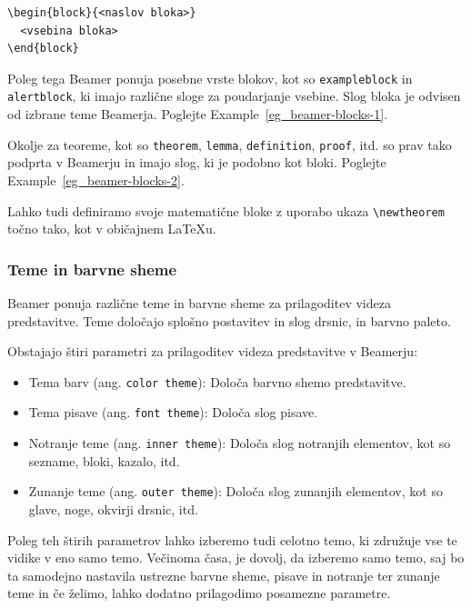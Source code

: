 \begin{verbatim}
\begin{block}{<naslov bloka>}
  <vsebina bloka>
\end{block}
\end{verbatim}

Poleg tega Beamer ponuja posebne vrste blokov, kot so \texttt{exampleblock} in \texttt{alertblock}, ki imajo različne sloge za poudarjanje vsebine. Slog bloka je odvisen od izbrane teme Beamerja. Poglejte Example~\ref{eg_beamer-blocks-1}.

\begin{example}\label{eg_beamer-blocks-1}\end{example}Okolje za teoreme, kot so \texttt{theorem}, \texttt{lemma}, \texttt{definition}, \texttt{proof}, itd. so prav tako podprta v Beamerju in imajo slog, ki je podobno kot bloki. Poglejte Example~\ref{eg_beamer-blocks-2}.

\begin{example}\label{eg_beamer-blocks-2}\end{example}Lahko tudi definiramo svoje matematične bloke z uporabo ukaza \texttt{{\textbackslash}newtheorem} točno tako, kot v običajnem LaTeXu.

\subsubsection{Teme in barvne sheme}\label{beamer_teme}

Beamer ponuja različne teme in barvne sheme za prilagoditev videza predstavitve. Teme določajo splošno postavitev in slog drsnic, in barvno paleto.

Obstajajo štiri parametri za prilagoditev videza predstavitve v Beamerju:

\begin{itemize}
\item Tema barv (ang. \texttt{color theme}): Določa barvno shemo predstavitve.
\item Tema pisave (ang. \texttt{font theme}): Določa slog pisave.
\item Notranje teme (ang. \texttt{inner theme}): Določa slog notranjih elementov, kot so sezname, bloki, kazalo, itd.
\item Zunanje teme (ang. \texttt{outer theme}): Določa slog zunanjih elementov, kot so glave, noge, okvirji drsnic, itd.
\end{itemize}

Poleg teh štirih parametrov lahko izberemo tudi celotno temo, ki združuje vse te vidike v eno samo temo. Večinoma časa, je dovolj, da izberemo samo temo, saj bo ta samodejno nastavila ustrezne barvne sheme, pisave in notranje ter zunanje teme in če želimo, lahko dodatno prilagodimo posamezne parametre.

